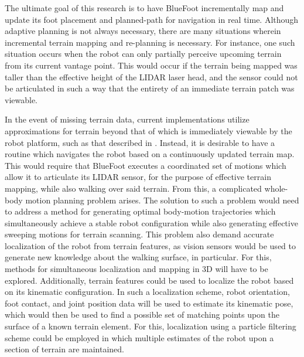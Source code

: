 The ultimate goal of this research is to have BlueFoot incrementally map and update its foot placement and planned-path for navigation in real time. Although adaptive planning is not always necessary, there are many situations wherein incremental terrain mapping and re-planning is necessary. For instance, one such situation occurs when the robot can only partially perceive upcoming terrain from its current vantage point. This would occur if the terrain being mapped was taller than the effective height of the LIDAR laser head, and the sensor could not be articulated in such a way that the entirety of an immediate terrain patch was viewable. 

In the event of missing terrain data, current implementations utilize approximations for terrain beyond that of which is immediately viewable by the robot platform, such as that described in \cite{Kolter2009}. Instead, it is desirable to have a routine which navigates the robot based on a continuously updated terrain map. This would require that BlueFoot executes a coordinated set of motions which allow it to articulate its LIDAR sensor, for the purpose of effective terrain mapping, while also walking over said terrain. From this, a complicated whole-body motion planning problem arises. The solution to such a problem would need to address a method for generating optimal body-motion trajectories which simultaneously achieve a stable robot configuration while also generating effective sweeping motions for terrain scanning. This problem also demand accurate localization of the robot from terrain features, as vision sensors would be used to generate new knowledge about the walking surface, in particular. For this, methods for simultaneous localization and mapping in 3D will have to be explored. Additionally, terrain features could be used to localize the robot based on its kinematic configuration. In such a localization scheme, robot orientation, foot contact, and joint position data will be used to estimate its kinematic pose, which would then be used to find a possible set of matching points upon the surface of a known terrain element. For this, localization using a particle filtering scheme could be employed in which multiple estimates of the robot upon a section of terrain are maintained.